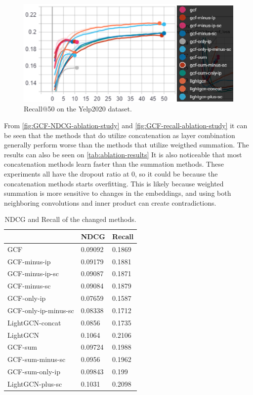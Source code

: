 \begin{figure}[h!]
    \includegraphics[width=\linewidth]{figures/gcf-all-recall.png}
    \caption{Recall@50 on the Yelp2020 dataset.}
    \label{fig:GCF-recall-ablation-study}
\end{figure}
From \autoref{fig:GCF-NDCG-ablation-study} and \autoref{fig:GCF-recall-ablation-study} it can be seen that the methods that do utilize concatenation as layer combination generally perform worse than the methods that utilize weigthed summation.
The results can also be seen on \autoref{tab:ablation-results}
It is also noticeable that most concatenation methods learn faster than the summation methods.
These experiments all have the dropout ratio at 0, so it could be because the concatenation methods starts overfitting.
This is likely because weighted summation is more sensitive to changes in the embeddings, and using both neighboring convolutions and inner product can create contradictions.
\begin{table}[]
    \centering
    \begin{tabular}{|l|l|l|}
        \hline
                             & NDCG    & Recall \\ \hline
        GCF                  & 0.09092 & 0.1869 \\ \hline
        GCF-minus-ip         & 0.09179 & 0.1881 \\ \hline
        GCF-minus-ip-sc      & 0.09087 & 0.1871 \\ \hline
        GCF-minus-sc         & 0.09084 & 0.1879 \\ \hline
        GCF-only-ip          & 0.07659 & 0.1587 \\ \hline
        GCF-only-ip-minus-sc & 0.08338 & 0.1712 \\ \hline
        LightGCN-concat      & 0.0856  & 0.1735 \\ \hline
        LightGCN             & 0.1064  & 0.2106 \\ \hline
        GCF-sum              & 0.09724 & 0.1988 \\ \hline
        GCF-sum-minus-sc     & 0.0956  & 0.1962 \\ \hline
        GCF-sum-only-ip      & 0.09843 & 0.199  \\ \hline
        LightGCN-plus-sc     & 0.1031  & 0.2098 \\ \hline
    \end{tabular}
    \caption{NDCG and Recall of the changed methods.}
    \label{tab:ablation-results}
\end{table}
